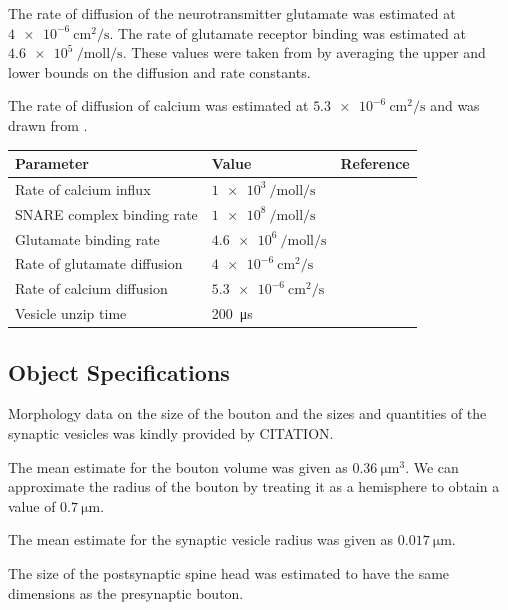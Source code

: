 \documentclass[a4paper]{article}
\begin{document}
The rate of diffusion of the neurotransmitter glutamate was estimated at $\SI{4e-6}{\centi\metre\squared\per\second}$. The rate of glutamate receptor binding was estimated at $\SI{4.6e5}{\per\mol\litre\per\second}$. These values were taken from \cite{rusakov2001role} by averaging the upper and lower bounds on the diffusion and rate constants.

The rate of diffusion of calcium was estimated at $\SI{5.3e-6}{\centi\metre\squared\per\second}$ and was drawn from \cite{Dittrich:BiophysJ:2013}.
\begin{table}[H]
\begin{tabular}{lll}
Parameter & Value & Reference \\ \hline
Rate of calcium influx   &  $\SI{1e3}{\per\mole\litre\per\second}$      &    \cite{Czech:MethodsMolBiol:2009} \\
SNARE complex binding rate & $\SI{1e8}{\per\mol\litre\per\second}$ & \cite{ma2014quantitative}\\
Glutamate binding rate & $\SI{4.6e6}{\per\mol\litre\per\second}$ & \cite{rusakov2001role} \\
Rate of glutamate diffusion & $\SI{4e-6}{\centi\metre\squared\per\second} $      &\cite{rusakov2001role} \\
Rate of calcium diffusion & $\SI{5.3e-6}{\centi\metre\squared\per\second} $      &\cite{Dittrich:BiophysJ:2013} \\
Vesicle unzip time & \SI{200}{\micro\second} & \cite{Llinas:TheSquidGiantSynapseAModel:1999}\\
\end{tabular}
\end{table}

\subsection{Object Specifications}
Morphology data on the size of the bouton and the sizes and quantities of the synaptic vesicles was kindly provided by CITATION. 

The mean estimate for the bouton volume was given as $\SI{0.36}{\micro\meter\cubed}$. We can approximate the radius of the bouton by treating it as a hemisphere to obtain a value of $\SI{0.7}{\micro\metre}$. 

The mean estimate for the synaptic vesicle radius was given as $\SI{0.017}{\micro\meter}$.

The size of the postsynaptic spine head was estimated to have the same dimensions as the presynaptic bouton.
\end{document}
